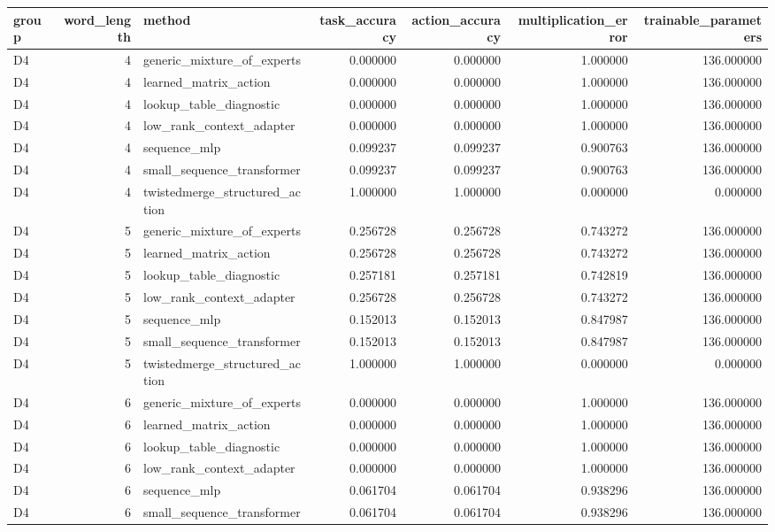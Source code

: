 \begin{tabular}{lrlrrrr}
\toprule
group & word_length & method & task_accuracy & action_accuracy & multiplication_error & trainable_parameters \\
\midrule
D4 & 4 & generic_mixture_of_experts & 0.000000 & 0.000000 & 1.000000 & 136.000000 \\
D4 & 4 & learned_matrix_action & 0.000000 & 0.000000 & 1.000000 & 136.000000 \\
D4 & 4 & lookup_table_diagnostic & 0.000000 & 0.000000 & 1.000000 & 136.000000 \\
D4 & 4 & low_rank_context_adapter & 0.000000 & 0.000000 & 1.000000 & 136.000000 \\
D4 & 4 & sequence_mlp & 0.099237 & 0.099237 & 0.900763 & 136.000000 \\
D4 & 4 & small_sequence_transformer & 0.099237 & 0.099237 & 0.900763 & 136.000000 \\
D4 & 4 & twistedmerge_structured_action & 1.000000 & 1.000000 & 0.000000 & 0.000000 \\
D4 & 5 & generic_mixture_of_experts & 0.256728 & 0.256728 & 0.743272 & 136.000000 \\
D4 & 5 & learned_matrix_action & 0.256728 & 0.256728 & 0.743272 & 136.000000 \\
D4 & 5 & lookup_table_diagnostic & 0.257181 & 0.257181 & 0.742819 & 136.000000 \\
D4 & 5 & low_rank_context_adapter & 0.256728 & 0.256728 & 0.743272 & 136.000000 \\
D4 & 5 & sequence_mlp & 0.152013 & 0.152013 & 0.847987 & 136.000000 \\
D4 & 5 & small_sequence_transformer & 0.152013 & 0.152013 & 0.847987 & 136.000000 \\
D4 & 5 & twistedmerge_structured_action & 1.000000 & 1.000000 & 0.000000 & 0.000000 \\
D4 & 6 & generic_mixture_of_experts & 0.000000 & 0.000000 & 1.000000 & 136.000000 \\
D4 & 6 & learned_matrix_action & 0.000000 & 0.000000 & 1.000000 & 136.000000 \\
D4 & 6 & lookup_table_diagnostic & 0.000000 & 0.000000 & 1.000000 & 136.000000 \\
D4 & 6 & low_rank_context_adapter & 0.000000 & 0.000000 & 1.000000 & 136.000000 \\
D4 & 6 & sequence_mlp & 0.061704 & 0.061704 & 0.938296 & 136.000000 \\
D4 & 6 & small_sequence_transformer & 0.061704 & 0.061704 & 0.938296 & 136.000000 \\

\end{tabular}
